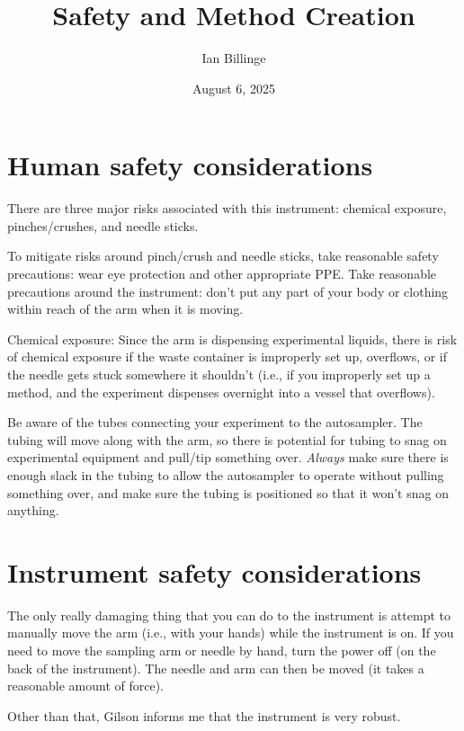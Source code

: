 \documentclass[11pt, oneside]{article}   	%
\title{Safety and Method Creation}
\author{Ian Billinge}
\date{August 6, 2025}							%
\begin{document}
\maketitle


\section{Human safety considerations}
There are three major risks associated with this instrument: chemical exposure, pinches/crushes, and needle sticks.

To mitigate risks around pinch/crush and needle sticks, take reasonable safety precautions: wear eye protection and other appropriate PPE. Take reasonable precautions around the instrument: don't put any part of your body or clothing within reach of the arm when it is moving.

Chemical exposure: Since the arm is dispensing experimental liquids, there is risk of chemical exposure if the waste container is improperly set up, overflows, or if the needle gets stuck somewhere it shouldn't (i.e., if you improperly set up a method, and the experiment dispenses overnight into a vessel that overflows).

Be aware of the tubes connecting your experiment to the autosampler. The tubing will move along with the arm, so there is potential for tubing to snag on experimental equipment and pull/tip something over. \emph{Always} make sure there is enough slack in the tubing to allow the autosampler to operate without pulling something over, and make sure the tubing is positioned so that it won't snag on anything.

\section{Instrument safety considerations}
The only really damaging thing that you can do to the instrument is attempt to manually move the arm (i.e., with your hands) while the instrument is on. If you need to move the sampling arm or needle by hand, turn the power off (on the back of the instrument). The needle and arm can then be moved (it takes a reasonable amount of force).

Other than that, Gilson informs me that the instrument is very robust.
\end{document}
